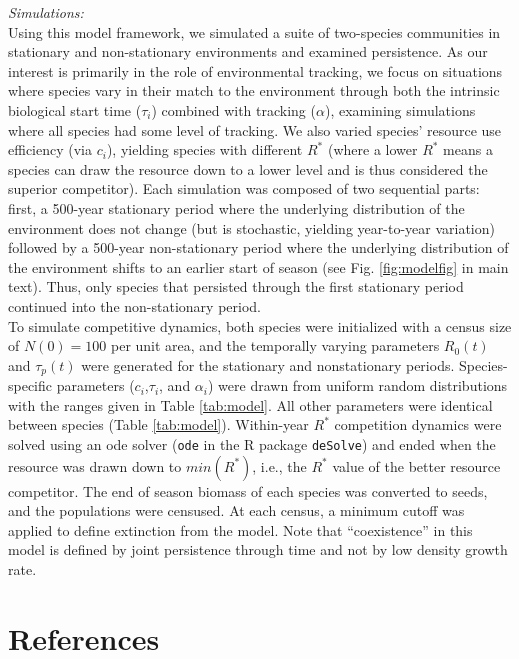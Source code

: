 \documentclass[11pt,letter]{article}
\begin{document}
\noindent \emph{Simulations:}\\
Using this model framework, we simulated a suite of two-species communities in stationary and non-stationary environments and examined persistence. As our interest is primarily in the role of environmental tracking, we focus on situations where species vary in their match to the environment through both the intrinsic biological start time ($\tau_i$) combined with tracking ($\alpha$), examining simulations where all species had some level of tracking. We also varied species' resource use efficiency (via $c_i$), yielding species with different $R^*$ (where a lower $R^*$ means a species can draw the resource down to a lower level and is thus considered the superior competitor). Each simulation was composed of two sequential parts: first, a 500-year stationary period where the underlying distribution of the environment does not change (but is stochastic, yielding year-to-year variation) followed by a 500-year non-stationary period where the underlying distribution of the environment shifts to an earlier start of season (see Fig. \ref{fig:modelfig} in main text). Thus, only species that persisted through the first stationary period continued into the non-stationary period.  \\

To simulate competitive dynamics, both species were initialized with a census size of $N(0) = 100$ per unit area, and the temporally varying parameters $R_0(t)$ and $\tau_{p}(t)$ were generated for the stationary and nonstationary periods. Species-specific parameters ($c_{i}$,$\tau_{i}$, and $\alpha_{i}$) were drawn from uniform random distributions with the ranges given in Table \ref{tab:model}.  All other parameters were identical between species (Table \ref{tab:model}).  Within-year $R^{*}$ competition dynamics were solved using an ode solver (\verb|ode| in the R package \verb|deSolve|) and ended when the resource was drawn down to $min(R^{*})$, i.e., the $R^{*}$ value of the better resource competitor.  The end of season biomass of each species was converted to seeds, and the populations were censused.  At each census, a minimum cutoff was applied to define extinction from the model.  Note that ``coexistence'' in this model is defined by joint persistence through time and not by low density growth rate. 

\section{References}


\end{document}
